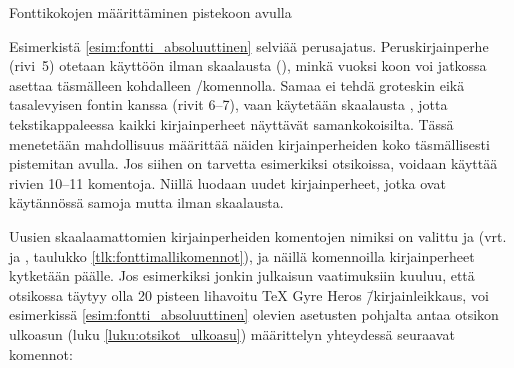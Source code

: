 \begin{esimerkki*}

  \caption{Fonttikokojen määrittäminen pistekoon avulla}
  \label{esim:fontti_absoluuttinen}
\end{esimerkki*}

Esimerkistä \ref{esim:fontti_absoluuttinen} selviää perusajatus.
Peruskirjainperhe (rivi~5) otetaan käyttöön ilman skaalausta
(), minkä vuoksi koon voi jatkossa asettaa täsmälleen
kohdalleen \-/komennolla. Samaa ei tehdä groteskin
eikä tasalevyisen fontin kanssa (rivit 6--7), vaan käytetään skaalausta
, jotta tekstikappaleessa kaikki kirjainperheet
näyttävät samankokoisilta. Tässä menetetään mahdollisuus määrittää
näiden kirjainperheiden koko täsmällisesti pistemitan avulla. Jos siihen
on tarvetta esimerkiksi otsikoissa, voidaan käyttää rivien 10--11
komentoja. Niillä luodaan uudet kirjainperheet, jotka ovat käytännössä
samoja mutta ilman skaalausta.

Uusien skaalaamattomien kirjainperheiden komentojen nimiksi on valittu
 ja  (vrt.
 ja , taulukko
\ref{tlk:fonttimallikomennot}), ja näillä komennoilla kirjainperheet
kytketään päälle. Jos esimerkiksi jonkin julkaisun vaatimuksiin kuuluu,
että otsikossa täytyy olla 20 pisteen lihavoitu TeX Gyre Heros
\=/kirjainleikkaus, voi esimerkissä \ref{esim:fontti_absoluuttinen}
olevien asetusten pohjalta antaa otsikon ulkoasun (luku
\ref{luku:otsikot_ulkoasu}) määrittelyn yhteydessä seuraavat komennot:


